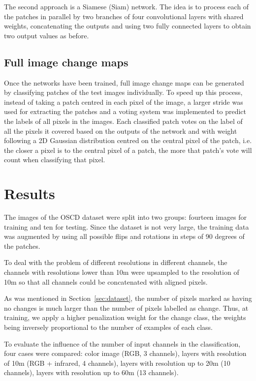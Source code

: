 \documentclass{article}
\begin{document}
The second approach is a Siamese (Siam) network. The idea is to process each of the patches in parallel by two branches of four convolutional layers with shared weights, concatenating the outputs and using two fully connected layers to obtain two output values as before.





\subsection{Full image change maps}
\label{ssec:cd-cms}

 

Once the networks have been trained, full image change maps can be generated by classifying patches of the test images individually. To speed up this process, instead of taking a patch centred in each pixel of the image, a larger stride was used for extracting the patches and a voting system was implemented to predict the labels of all pixels in the images. Each classified patch votes on the label of all the pixels it covered based on the outputs of the network and with weight following a 2D Gaussian distribution centred on the central pixel of the patch, i.e. the closer a pixel is to the central pixel of a patch, the more that patch's vote will count when classifying that pixel.


\section{Results}
\label{sec:results}


The images of the OSCD dataset were split into two groups: fourteen images for training and ten for testing. Since the dataset is not very large, the training data was augmented by using all possible flips and rotations in steps of 90 degrees of the patches.

To deal with the problem of different resolutions in different channels, the channels with resolutions lower than 10m were upsampled to the resolution of 10m so that all channels could be concatenated with aligned pixels.

As was mentioned in Section~\ref{sec:dataset}, the number of pixels marked as having no changes is much larger than the number of pixels labelled as change. Thus, at training, we apply a higher penalization weight for the change class, the weights being inversely proportional to the number of examples of each class.


To evaluate the influence of the number of input channels in the classification, four cases were compared: color image (RGB, 3 channels), layers with resolution of 10m (RGB + infrared, 4 channels), layers with resolution up to 20m (10 channels), layers with resolution up to 60m (13 channels).
\end{document}
